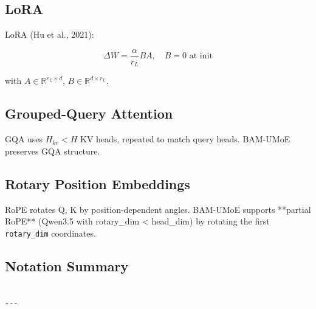 \subsection{LoRA}

LoRA (Hu et al., 2021):

\[
\Delta W = \frac{\alpha}{r_L} B A, \quad B = 0 \text{ at init}
\]

with $A \in \mathbb{R}^{r_L \times d}$, $B \in \mathbb{R}^{d \times r_L}$.

\subsection{Grouped-Query Attention}

GQA uses $H_{kv} < H$ KV heads, repeated to match query heads. BAM-UMoE 
preserves GQA structure.

\subsection{Rotary Position Embeddings}

RoPE rotates Q, K by position-dependent angles. BAM-UMoE supports **partial 
RoPE** (Qwen3.5 with rotary\_dim < head\_dim) by rotating the first 
\texttt{rotary\_dim} coordinates.

\subsection{Notation Summary}

\begin{lstlisting}

---
\end{lstlisting}